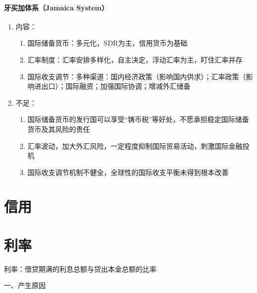 \documentclass[12pt]{book}
\begin{document}
\subsubsection{牙买加体系（Jamaica System）}

\begin{enumerate}[1.]
    \item 内容：
          \begin{enumerate}[(1)]
              \item 国际储备货币：多元化，SDR为主，信用货币为基础
              \item 汇率制度：汇率安排多样化，自主决定，浮动汇率为主，盯住汇率并存
              \item 国际收支调节：多种渠道：国内经济政策（影响国内供求）；汇率政策（影响进出口）；国际融资；加强国际协调；增减外汇储备
          \end{enumerate}
    \item 不足：
          \begin{enumerate}[(1)]
              \item 国际储备货币的发行国可以享受“铸币税”等好处，不愿承担稳定国际储备货币及其风险的责任
              \item 汇率波动，加大外汇风险，一定程度抑制国际贸易活动，刺激国际金融投机
              \item 国际收支调节机制不健全，全球性的国际收支平衡未得到根本改善
          \end{enumerate}
\end{enumerate}



\chapter{信用}




\chapter{利率}


利率：借贷期满的利息总额与贷出本金总额的比率

一、产生原因
\end{document}
